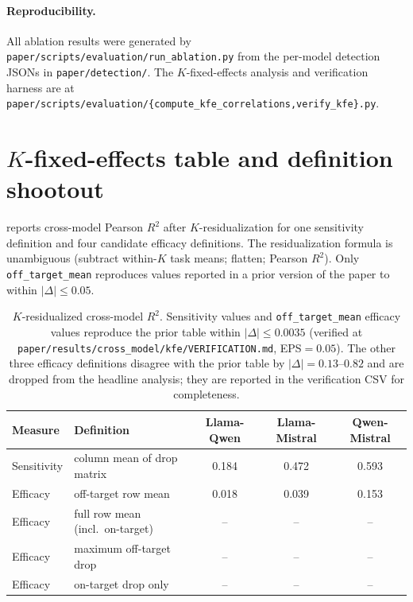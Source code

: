 \documentclass{article}
\theoremstyle{plain}
\theoremstyle{definition}
\theoremstyle{remark}
\begin{document}
\paragraph{Reproducibility.} All ablation results were generated by \texttt{paper/scripts/evaluation/run\_ablation.py} from the per-model detection JSONs in \texttt{paper/detection/}. The $K$-fixed-effects analysis and verification harness are at \texttt{paper/scripts/evaluation/\{compute\_kfe\_correlations,verify\_kfe\}.py}.

\section{$K$-fixed-effects table and definition shootout}
\label{app:kfe}
\label{app:kfe-defs}

 reports cross-model Pearson $R^2$ after $K$-residualization for one sensitivity definition and four candidate efficacy definitions. The residualization formula is unambiguous (subtract within-$K$ task means; flatten; Pearson $R^2$). Only \texttt{off\_target\_mean} reproduces values reported in a prior version of the paper to within $|\Delta| \leq 0.05$.

\begin{table}[h]
\centering
\small
\begin{tabular}{llccc}
\toprule
\textbf{Measure} & \textbf{Definition} & \textbf{Llama-Qwen} & \textbf{Llama-Mistral} & \textbf{Qwen-Mistral} \\
\midrule
Sensitivity & column mean of drop matrix     & 0.184 & 0.472 & 0.593 \\
Efficacy    & off-target row mean             & 0.018 & 0.039 & 0.153 \\
Efficacy    & full row mean (incl.\ on-target) & --    & --    & --    \\
Efficacy    & maximum off-target drop         & --    & --    & --    \\
Efficacy    & on-target drop only             & --    & --    & --    \\
\bottomrule
\end{tabular}
\caption{$K$-residualized cross-model $R^2$. Sensitivity values and \texttt{off\_target\_mean} efficacy values reproduce the prior table within $|\Delta| \leq 0.0035$ (verified at \texttt{paper/results/cross\_model/kfe/VERIFICATION.md}, EPS$=0.05$). The other three efficacy definitions disagree with the prior table by $|\Delta|=0.13$--$0.82$ and are dropped from the headline analysis; they are reported in the verification CSV for completeness.}
\label{tab:kfe-full}
\end{table}
\end{document}
